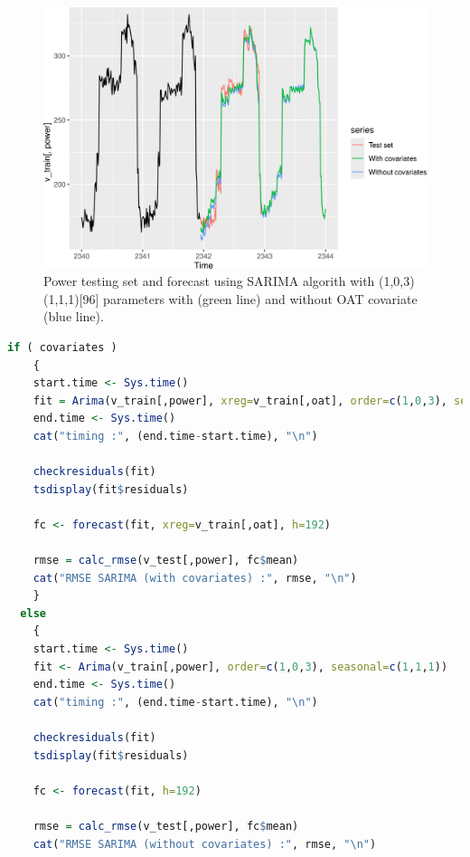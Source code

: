 \begin{figure}[H]
\centering
 \includegraphics[scale=0.5]{figures/figure_fit_sarima.png}
\caption{Power testing set and forecast using SARIMA algorith with (1,0,3)(1,1,1)[96] parameters 
with (green line) and without OAT covariate (blue line).}
\label{figure_fit_sarima}
\end{figure}

\begin{lstlisting}[language=R, caption={R code for SARIMA modelling and forecasting}, captionpos=b, label={lst_sarima}]
  if ( covariates )
    {
    start.time <- Sys.time()
    fit = Arima(v_train[,power], xreg=v_train[,oat], order=c(1,0,3), seasonal=c(1,1,1))
    end.time <- Sys.time()
    cat("timing :", (end.time-start.time), "\n")

    checkresiduals(fit)
    tsdisplay(fit$residuals)

    fc <- forecast(fit, xreg=v_train[,oat], h=192)

    rmse = calc_rmse(v_test[,power], fc$mean)
    cat("RMSE SARIMA (with covariates) :", rmse, "\n")
    }
  else
    {
    start.time <- Sys.time()
    fit <- Arima(v_train[,power], order=c(1,0,3), seasonal=c(1,1,1))
    end.time <- Sys.time()
    cat("timing :", (end.time-start.time), "\n")

    checkresiduals(fit)
    tsdisplay(fit$residuals)

    fc <- forecast(fit, h=192)

    rmse = calc_rmse(v_test[,power], fc$mean)
    cat("RMSE SARIMA (without covariates) :", rmse, "\n")
\end{lstlisting}

